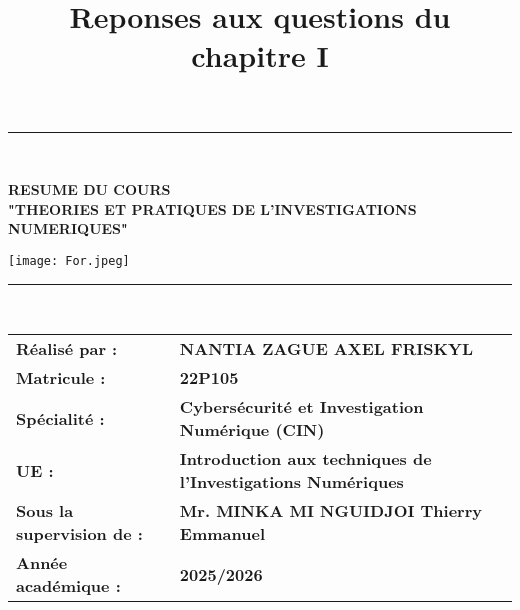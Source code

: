 \documentclass[12pt, a4paper]{article}
\begin{document}
\begin{titlepage}
	\vspace{1.5cm}
	
	\noindent\rule{0.9\textwidth}{0.8pt}\\
	\vspace{0.5cm}
	
	\vspace{0.8cm}
	{\Large \textbf{RESUME DU COURS}}\\
	\vspace{0.5cm}
	{\Large \textbf{"THEORIES ET PRATIQUES DE L'INVESTIGATIONS NUMERIQUES"}}\\
	\vspace{0.8cm}
	
	\texttt{[image: For.jpeg]}
	\noindent\rule{0.9\textwidth}{0.8pt}\\
	\vspace{1.5cm}
	
	\begin{tabular}{@{}>{\bfseries}l l@{}}
		\vspace{0.5cm}
		Réalisé par : & \textbf{NANTIA ZAGUE AXEL FRISKYL} \\
		\vspace{0.5cm}
		Matricule : & \textbf{22P105} \\
		\vspace{0.5cm}
		Spécialité : & \textbf{Cybersécurité et Investigation Numérique (CIN)} \\
		\vspace{0.5cm}
		UE : & \textbf{Introduction aux techniques de l'Investigations Numériques} \\
		\vspace{0.5cm}
		Sous la supervision de : & \textbf{Mr. MINKA MI NGUIDJOI Thierry Emmanuel} \\
		\vspace{0.5cm}
		Année académique : & \textbf{2025/2026} \\
	\end{tabular}
	
\end{titlepage}

\thispagestyle{empty}
\newpage


\title{\textbf{Reponses aux questions du chapitre I}}
\author{}
\date{}


	
	\maketitle
	
\end{document}
